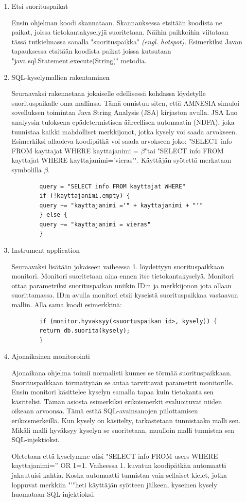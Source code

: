 \documentclass[finnish]{tktltiki2}
\theoremstyle{definition}
\theoremstyle{remark}
\begin{document}
	\begin{enumerate}
		\item{Etsi suorituspaikat}
		
		Ensin ohjelman koodi skannataan. Skannauksessa etsitään koodista ne paikat, joissa tietokantakyselyjä suoritetaan. Näihin paikkoihin viitataan tässä tutkielmassa sanalla "suorituspaikka" \textit{(engl. hotspot)}. Esimerkiksi Javan tapauksessa etsitään koodista paikat joissa kutsutaan "java.sql.Statement.execute(String)" \space metodia.
		\item{SQL-kyselymallien rakentaminen}
		
		Seuraavaksi rakennetaan jokaiselle edellisessä kohdassa löydetylle suorituspaikalle oma mallinsa. Tämä onnistuu siten, että AMNESIA simuloi sovelluksen toimintaa Java String Analysis (JSA) kirjaston avulla. JSA Luo analyysin tuloksena epädetermistisen ääreellisen automaatin (NDFA), joka tunnistaa kaikki mahdolliset merkkijonot, jotka kysely voi saada arvokseen. Esimerkiksi allaoleva koodipätkä voi saada arvokseen joko: 
		"SELECT info FROM kayttajat WHERE kayttajanimi = $\beta$"\space tai "SELECT info FROM kayttajat WHERE kayttajanimi='vieras'". Käyttäjän syötettä merkataan symbolilla $\beta$.
		
		\begin{lstlisting}
		query = "SELECT info FROM kayttajat WHERE"
		if (!kayttajanimi.empty) {
		query += "kayttajanimi ='" + kayttajanimi + "'"
		} else {
		query += "kayttajanimi = vieras"
		}
		\end{lstlisting}
		
		
		\item{Instrument application}
		
		Seuraavaksi lisätään jokaiseen vaiheessa 1. löydettyyn suorituspaikkaan monitori. Monitori suoritetaan aina ennen itse tietokantakyselyä. Monitori ottaa parametriksi suorituspaikan uniikin ID:n ja merkkijonon jota ollaan suorittamassa. ID:n avulla monitori etsii kyseistä suorituspaikkaa vastaavan mallin. Alla sama koodi esimerkkinä: 
		\begin{lstlisting}
		if (monitor.hyvaksyy(<suortuspaikan id>, kysely)) {
		return db.suorita(kysely);
		}
		\end{lstlisting}
		\item{Ajonaikainen monitorointi}
		
		Ajonaikana ohjelma toimii normalisti kunnes se törmää suorituspaikkaan. Suorituspaikkaan törmättyään se antaa tarvittavat parametrit monitorille. Ensin monitori käsittelee kyselyn samalla tapaa kuin tietokanta sen käsittelisi. Tämän asiosta esimerkiksi erikoismerkit evaluoituvat niiden oikeaan arvoonsa. Tämä estää SQL-avainsanojen piilottamisen erikoismerkeillä. Kun kysely on käsitelty, tarkastetaan tunnistaako malli sen. Mikäli malli hyväksyy kyselyn se suoritetaan, muulloin malli tunnistaa sen SQL-injektioksi.
		
		Oletetaan että kyselymme olisi "SELECT info FROM users WHERE kayttajanimi='' OR 1=1. Vaiheessa 1. kuvatun koodipätkän automaatti jakautuisi kahtia. Koska automaatti tunnistaa vain sellaiset kielet, jotka loppuvat merkkiin "\space'\space"\space heti käyttäjän syötteen jälkeen, kyseinen kysely huomataan SQL-injektioksi.
			\end{enumerate}
\end{document}
